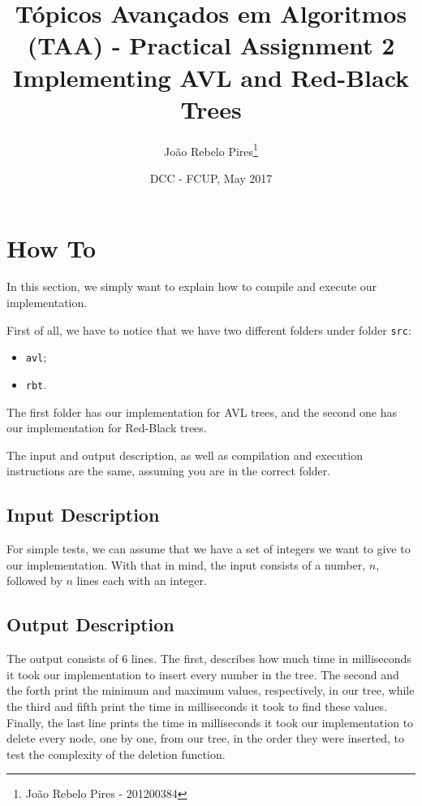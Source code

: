 \documentclass[12pt,a4paper,oneside]{article}
\title{Tópicos Avançados em Algoritmos (TAA) - Practical Assignment 2 \\\large Implementing AVL and Red-Black Trees}
\author{João Rebelo Pires\footnote{João Rebelo Pires - 201200384}}
\date{DCC - FCUP, May 2017}
\theoremstyle{definition}
\begin{document}
\maketitle


\section{How To}\label{sec:for_dummies}

In this section, we simply want to explain how to compile and execute our implementation.

First of all, we have to notice that we have two different folders under folder \texttt{src}:

\begin{itemize}
	\item \texttt{avl};
	\item \texttt{rbt}.
\end{itemize}

The first folder has our implementation for AVL trees, and the second one has our implementation for Red-Black trees.

The input and output description, as well as compilation and execution instructions are the same, assuming you are in the correct folder.

\subsection{Input Description}\label{subsec:input_descrip}

For simple tests, we can assume that we have a set of integers we want to give to our implementation. With that in mind, the input consists of a number, $n$, followed by $n$ lines each with an integer.

\subsection{Output Description}\label{subsec:output_descrip}

The output consists of $6$ lines. The first, describes how much time in milliseconds it took our implementation to insert every number in the tree. The second and the forth print the minimum and maximum values, respectively, in our tree, while the third and fifth print the time in milliseconds it took to find these values. Finally, the last line prints the time in milliseconds it took our implementation to delete every node, one by one, from our tree, in the order they were inserted, to test the complexity of the deletion function.
\end{document}
